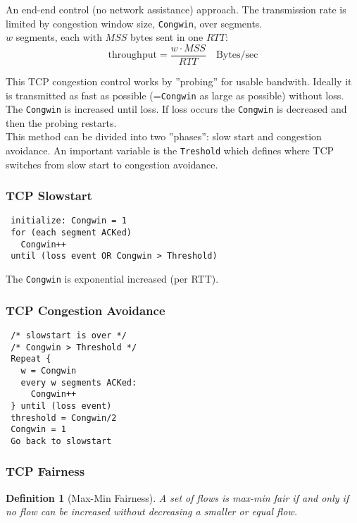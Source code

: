 \documentclass[10pt, a4paper, twocolumn]{scrartcl}
\newtheorem{definition}{Definition}
\begin{document}
An end-end control (no network assistance) approach. The transmission rate is limited by congestion window size, \verb#Congwin#, over segments.\\

$w$ segments, each with $MSS$ bytes sent in one $RTT$:
\begin{displaymath}
	\mbox{throughput} = \frac{w\cdotp MSS}{RTT} \quad \mbox{Bytes/sec}
\end{displaymath}

This TCP congestion control works by ''probing'' for usable bandwith. Ideally it is transmitted as fast as possible (=\verb#Congwin# as large as possible) without loss. The \verb#Congwin# is increased until loss. If loss occurs the \verb#Congwin# is decreased and then the probing restarts.\\

This method can be divided into two ''phases'': slow start and congestion avoidance. An important variable is the \verb#Treshold# which defines where TCP switches from slow start to congestion avoidance.

\subsubsection{TCP Slowstart}

\begin{verbatim}
 initialize: Congwin = 1
 for (each segment ACKed)
   Congwin++
 until (loss event OR Congwin > Threshold)
\end{verbatim}

The \verb#Congwin# is exponential increased (per RTT).

\subsubsection{TCP Congestion Avoidance}

\begin{verbatim}
 /* slowstart is over */
 /* Congwin > Threshold */
 Repeat {
   w = Congwin
   every w segments ACKed:
     Congwin++
 } until (loss event)
 threshold = Congwin/2
 Congwin = 1
 Go back to slowstart
\end{verbatim}

\subsubsection{TCP Fairness}

\begin{definition}[Max-Min Fairness]
 A set of flows is max-min fair if and only if no flow can be increased without decreasing a smaller or equal flow.
\end{definition}
\end{document}
